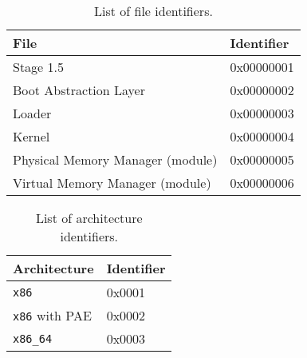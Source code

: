 \documentclass[a4paper,oneside]{memoir}
\begin{document}
\begin{table}
    \centering
    \begin{tabular}{ l l }
        \hline
            File                                      & Identifier  \\ \hline
            Stage 1.5                                 & 0x00000001  \\
            Boot Abstraction Layer                    & 0x00000002  \\
            Loader                                    & 0x00000003  \\
            Kernel                                    & 0x00000004  \\
            Physical Memory Manager (module)          & 0x00000005  \\
            Virtual Memory Manager (module)           & 0x00000006  \\
        \hline
    \end{tabular}
    \caption{List of file identifiers. \label{tab:File identifiers}}
\end{table}

\begin{table}
    \centering
    \begin{tabular}{ l l }
        \hline
            Architecture          & Identifier  \\ \hline
            \texttt{x86}          & 0x0001      \\
            \texttt{x86} with PAE & 0x0002      \\
            \texttt{x86\_64}      & 0x0003      \\
        \hline
    \end{tabular}
    \caption{List of architecture identifiers. \label{tab:Arch identifiers}}
\end{table}
\end{document}

